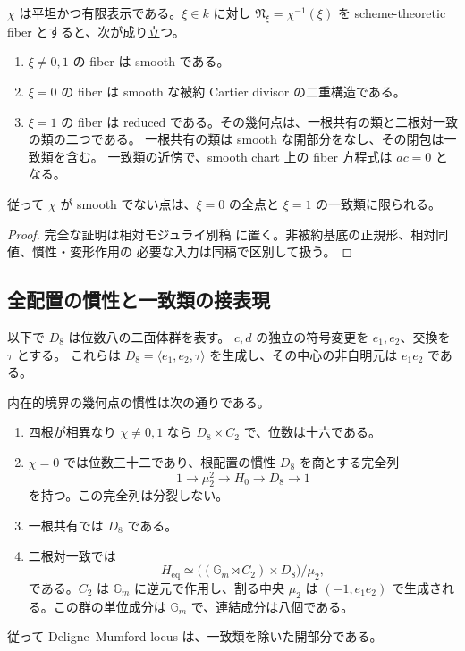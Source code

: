 \begin{proposition}
\label{prop:noncubic-good-moduli-fibers}
$\chi$ は平坦かつ有限表示である。$\xi\in k$ に対し
$\mathfrak N_\xi=\chi^{-1}(\xi)$ を scheme-theoretic fiber とすると、次が成り立つ。
\begin{enumerate}
\item $\xi\ne0,1$ の fiber は smooth である。
\item $\xi=0$ の fiber は smooth な被約 Cartier divisor の二重構造である。
\item $\xi=1$ の fiber は reduced である。その幾何点は、一根共有の類と二根対一致の類の二つである。
一根共有の類は smooth な開部分をなし、その閉包は一致類を含む。
一致類の近傍で、smooth chart 上の fiber 方程式は $ac=0$ となる。
\end{enumerate}
従って $\chi$ が smooth でない点は、$\xi=0$ の全点と $\xi=1$ の一致類に限られる。
\end{proposition}
\begin{proof}
完全な証明は相対モジュライ別稿
\cite[noncubic 境界の相対表示とモジュライ写像]{QuadricModuli2026}
に置く。非被約基底の正規形、相対同値、慣性・変形作用の
必要な入力は同稿で区別して扱う。
\end{proof}


\subsection{全配置の慣性と一致類の接表現}

以下で $D_8$ は位数八の二面体群を表す。
$c,d$ の独立の符号変更を $e_1,e_2$、交換を $\tau$ とする。
これらは $D_8=\langle e_1,e_2,\tau\rangle$ を生成し、その中心の非自明元は $e_1e_2$ である。

\begin{proposition}[特殊配置も含む全慣性]
\label{prop:noncubic-all-stabilizers}
内在的境界の幾何点の慣性は次の通りである。
\begin{enumerate}
\item 四根が相異なり $\chi\ne0,1$ なら $D_8\times C_2$ で、位数は十六である。
\item $\chi=0$ では位数三十二であり、根配置の慣性 $D_8$ を商とする完全列
\[
 1\longrightarrow\mu_2^2\longrightarrow H_0\longrightarrow D_8\longrightarrow1
\]
を持つ。この完全列は分裂しない。
\item 一根共有では $D_8$ である。
\item 二根対一致では
\begin{equation}\label{eq:noncubic-coincident-full-stabilizer}
 H_{\mathrm{eq}}\simeq
 \bigl((\mathbb G_m\rtimes C_2)\times D_8\bigr)/\mu_2,
\end{equation}
である。$C_2$ は $\mathbb G_m$ に逆元で作用し、割る中央 $\mu_2$ は
$(-1,e_1e_2)$ で生成される。この群の単位成分は $\mathbb G_m$ で、連結成分は八個である。
\end{enumerate}
従って Deligne--Mumford locus は、一致類を除いた開部分である。
\end{proposition}


